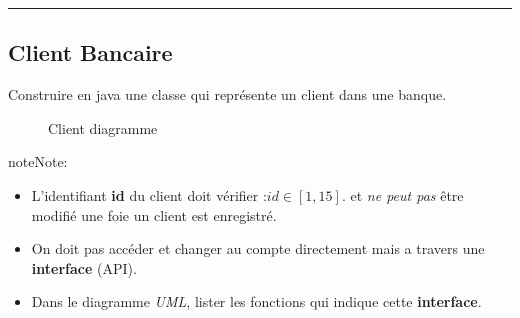 \documentclass[letterpaper,10pt,english]{sphinxmanual}
\begin{document}
\bigskip\hrule{}\bigskip



\subsection{Client Bancaire}
\label{classes:client-bancaire}
Construire en java une classe qui représente un client dans une banque.
\begin{figure}[htbp]
\centering
\capstart

\caption{Client diagramme}\end{figure}

\begin{notice}{note}{Note:}\begin{itemize}
\item {} 
L'identifiant \textbf{id} du client doit vérifier :\(id \in [1,15]\). et \emph{ne peut pas} être modifié une foie un client est enregistré.

\item {} 
On doit pas accéder et changer au compte directement mais a travers une \textbf{interface} (API).

\item {} 
Dans le diagramme \emph{UML}, lister les fonctions qui indique cette \textbf{interface}.

\end{itemize}
\end{notice}
\end{document}
